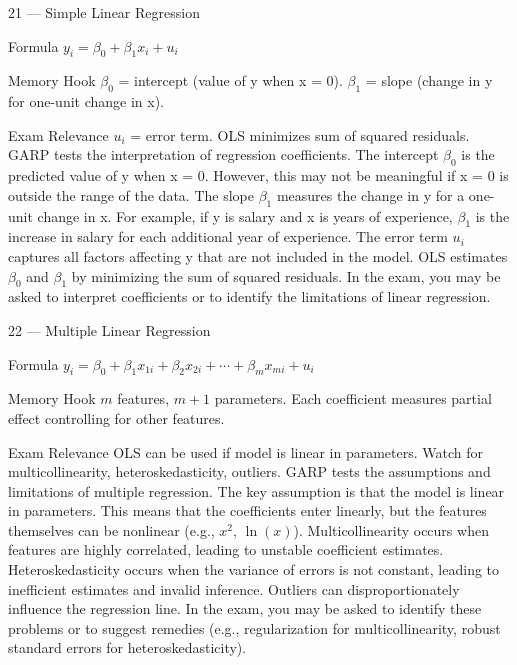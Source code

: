 \documentclass[aspectratio=169,8pt]{beamer}
\begin{document}
	\begin{frame}{21 --- Simple Linear Regression}
		\begin{block}{Formula}
			$y_i = \beta_0 + \beta_1 x_i + u_i$
		\end{block}
		\begin{block}{Memory Hook}
			$\beta_0$ = intercept (value of y when x = 0). $\beta_1$ = slope (change in y for one-unit change in x).
		\end{block}
		\begin{block}{Exam Relevance}
			$u_i$ = error term. OLS minimizes sum of squared residuals. GARP tests the interpretation of regression coefficients. The intercept $\beta_0$ is the predicted value of y when x = 0. However, this may not be meaningful if x = 0 is outside the range of the data. The slope $\beta_1$ measures the change in y for a one-unit change in x. For example, if y is salary and x is years of experience, $\beta_1$ is the increase in salary for each additional year of experience. The error term $u_i$ captures all factors affecting y that are not included in the model. OLS estimates $\beta_0$ and $\beta_1$ by minimizing the sum of squared residuals. In the exam, you may be asked to interpret coefficients or to identify the limitations of linear regression.
		\end{block}
	\end{frame}
	
	\begin{frame}{22 --- Multiple Linear Regression}
		\begin{block}{Formula}
			$y_i = \beta_0 + \beta_1 x_{1i} + \beta_2 x_{2i} + \cdots + \beta_m x_{mi} + u_i$
		\end{block}
		\begin{block}{Memory Hook}
			$m$ features, $m+1$ parameters. Each coefficient measures partial effect controlling for other features.
		\end{block}
		\begin{block}{Exam Relevance}
			OLS can be used if model is linear in parameters. Watch for multicollinearity, heteroskedasticity, outliers. GARP tests the assumptions and limitations of multiple regression. The key assumption is that the model is linear in parameters. This means that the coefficients enter linearly, but the features themselves can be nonlinear (e.g., $x^2$, $\ln(x)$). Multicollinearity occurs when features are highly correlated, leading to unstable coefficient estimates. Heteroskedasticity occurs when the variance of errors is not constant, leading to inefficient estimates and invalid inference. Outliers can disproportionately influence the regression line. In the exam, you may be asked to identify these problems or to suggest remedies (e.g., regularization for multicollinearity, robust standard errors for heteroskedasticity).
		\end{block}
	\end{frame}
	
\end{document}
